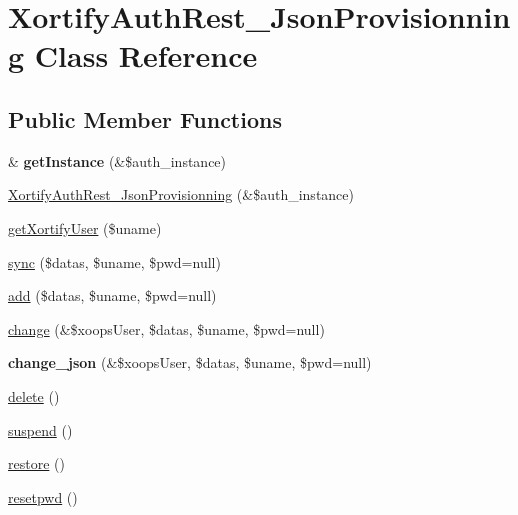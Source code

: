 \hypertarget{class_xortify_auth_rest___json_provisionning}{\section{Xortify\-Auth\-Rest\-\_\-\-Json\-Provisionning Class Reference}
\label{class_xortify_auth_rest___json_provisionning}
}
\subsection*{Public Member Functions}
\begin{DoxyCompactItemize}
\item 
\hypertarget{class_xortify_auth_rest___json_provisionning_a2c8eaa915c70d75289ac8a03686194f9}{\& {\bfseries get\-Instance} (\&\$auth\-\_\-instance)}\label{class_xortify_auth_rest___json_provisionning_a2c8eaa915c70d75289ac8a03686194f9}

\item 
\hyperlink{class_xortify_auth_rest___json_provisionning_a03e64738687ab1fe682d5ab476372acd}{Xortify\-Auth\-Rest\-\_\-\-Json\-Provisionning} (\&\$auth\-\_\-instance)
\item 
\hyperlink{class_xortify_auth_rest___json_provisionning_a041d726ac26672547ed1504e8e0117aa}{get\-Xortify\-User} (\$uname)
\item 
\hyperlink{class_xortify_auth_rest___json_provisionning_a35dc08b0f2138eb818ff95345b73bcff}{sync} (\$datas, \$uname, \$pwd=null)
\item 
\hyperlink{class_xortify_auth_rest___json_provisionning_adfc9fcef01e7bd7b2f47e8e79d51fc63}{add} (\$datas, \$uname, \$pwd=null)
\item 
\hyperlink{class_xortify_auth_rest___json_provisionning_ae1f0971b9712c794620cf309164e43af}{change} (\&\$xoops\-User, \$datas, \$uname, \$pwd=null)
\item 
\hypertarget{class_xortify_auth_rest___json_provisionning_a94f4e0408f26e65abca347ec883f4ec9}{{\bfseries change\-\_\-json} (\&\$xoops\-User, \$datas, \$uname, \$pwd=null)}\label{class_xortify_auth_rest___json_provisionning_a94f4e0408f26e65abca347ec883f4ec9}

\item 
\hyperlink{class_xortify_auth_rest___json_provisionning_a13bdffdd926f26b825ea57066334ff01}{delete} ()
\item 
\hyperlink{class_xortify_auth_rest___json_provisionning_ad73006a505121228f3b075c2409787d2}{suspend} ()
\item 
\hyperlink{class_xortify_auth_rest___json_provisionning_aa1371f22826cf8cde4454c9b467203d0}{restore} ()
\item 
\hyperlink{class_xortify_auth_rest___json_provisionning_a06d70fbd3a2db390b6f2530c0076628e}{resetpwd} ()
\end{DoxyCompactItemize}
